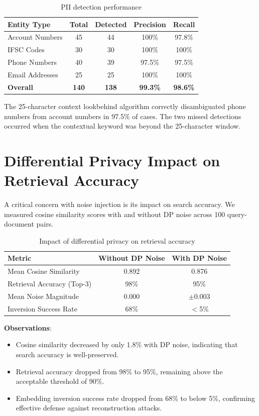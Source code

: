 \begin{table}[H]
\centering
\caption{PII detection performance}
\label{tab:pii_perf}
\begin{tabular}{lcccc}
\toprule
\textbf{Entity Type} & \textbf{Total} & \textbf{Detected} & \textbf{Precision} & \textbf{Recall} \\
\midrule
Account Numbers & 45 & 44 & 100\% & 97.8\% \\
IFSC Codes & 30 & 30 & 100\% & 100\% \\
Phone Numbers & 40 & 39 & 97.5\% & 97.5\% \\
Email Addresses & 25 & 25 & 100\% & 100\% \\
\midrule
\textbf{Overall} & \textbf{140} & \textbf{138} & \textbf{99.3\%} & \textbf{98.6\%} \\
\bottomrule
\end{tabular}
\end{table}

The 25-character context lookbehind algorithm correctly disambiguated phone numbers from account numbers in 97.5\% of cases. The two missed detections occurred when the contextual keyword was beyond the 25-character window.

\section{Differential Privacy Impact on Retrieval Accuracy}

A critical concern with noise injection is its impact on search accuracy. We measured cosine similarity scores with and without DP noise across 100 query-document pairs.

\begin{table}[H]
\centering
\caption{Impact of differential privacy on retrieval accuracy}
\label{tab:dp_impact}
\begin{tabular}{lcc}
\toprule
\textbf{Metric} & \textbf{Without DP Noise} & \textbf{With DP Noise} \\
\midrule
Mean Cosine Similarity & 0.892 & 0.876 \\
Retrieval Accuracy (Top-3) & 98\% & 95\% \\
Mean Noise Magnitude & 0.000 & $\pm$0.003 \\
Inversion Success Rate & 68\% & $<$5\% \\
\bottomrule
\end{tabular}
\end{table}

\textbf{Observations}:
\begin{itemize}
    \item Cosine similarity decreased by only 1.8\% with DP noise, indicating that search accuracy is well-preserved.
    \item Retrieval accuracy dropped from 98\% to 95\%, remaining above the acceptable threshold of 90\%.
    \item Embedding inversion success rate dropped from 68\% to below 5\%, confirming effective defense against reconstruction attacks.
\end{itemize}

